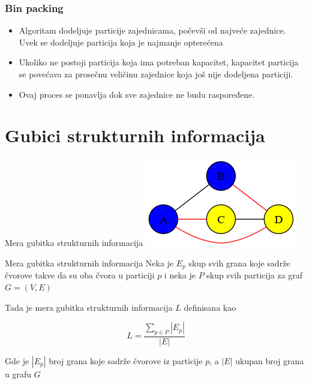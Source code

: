 \documentclass{beamer}
\begin{document}
\begin{frame}
    \frametitle{Bin packing}
    \begin{itemize}
        \item Algoritam dodeljuje particije zajednicama, počevši od najveće zajednice. Uvek se dodeljuje particija koja je najmanje opterećena
        \item Ukoliko ne postoji particija koja ima potreban kapacitet, kapacitet particija se povećava za prosečnu veličinu zajednice koja još nije dodeljena particiji. 
        \item Ovaj proces se ponavlja dok sve zajednice ne budu raspoređene.
    \end{itemize}
\end{frame}


\section{Gubici strukturnih informacija}
\begin{frame}{Mera gubitka strukturnih informacija}
    \includegraphics[width=\textwidth]{dot/graf.png}
\end{frame}

\begin{frame}{Mera gubitka strukturnih informacija}
    Neka je $ E_p $ skup svih grana koje sadrže čvorove takve da su oba čvora u particiji $ p $  i neka je $ P $ skup svih particija za graf $ G = (V, E) $

    Tada je mera gubitka strukturnih informacija $ L $ definisana kao

    $$ L = \frac{\sum_{p \in P} |E_p|}{|E|} $$

    Gde je $ |E_p| $ broj grana koje sadrže čvorove iz particije $ p $, a $ |E| $ ukupan broj grana u grafu $ G $
\end{frame}
\end{document}
